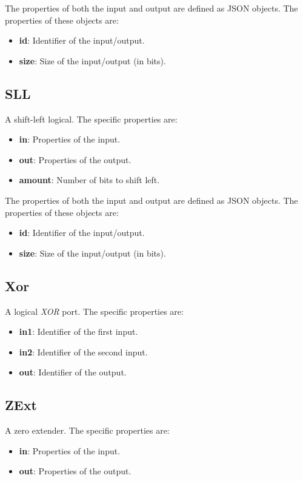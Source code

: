 \documentclass[11pt,a4paper,twoside,titlepage]{report}
\begin{document}
The properties of both the input and output are defined as JSON objects. 
The properties of these objects are:
\begin{itemize}
	\item \textbf{id}: Identifier of the input/output.
	\item \textbf{size}: Size of the input/output (in bits).
\end{itemize}

\subsection{SLL}

A shift-left logical. The specific properties are:
\begin{itemize}
	\item \textbf{in}: Properties of the input.
	\item \textbf{out}: Properties of the output.
	\item \textbf{amount}: Number of bits to shift left.
\end{itemize}

The properties of both the input and output are defined as JSON objects. 
The properties of these objects are:
\begin{itemize}
	\item \textbf{id}: Identifier of the input/output.
	\item \textbf{size}: Size of the input/output (in bits).
\end{itemize}

\subsection{Xor}

A logical \textit{XOR} port. The specific properties are:
\begin{itemize}
	\item \textbf{in1}: Identifier of the first input.
	\item \textbf{in2}: Identifier of the second input.
	\item \textbf{out}: Identifier of the output.
\end{itemize}

\subsection{ZExt}

A zero extender. The specific properties are:
\begin{itemize}
	\item \textbf{in}: Properties of the input.
	\item \textbf{out}: Properties of the output.
\end{itemize}
\end{document}
